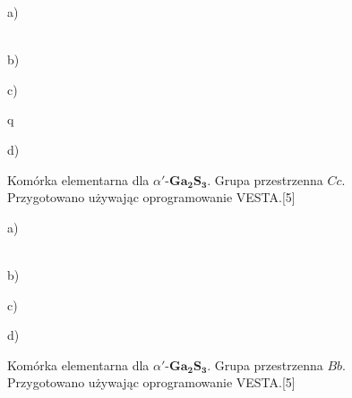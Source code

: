 \begin{enumerate}
	\begin{figure}[H]
		\begin{minipage}[h]{0.47\linewidth}
			 a) \\
		\end{minipage}
		\hfill
		\begin{minipage}[h]{0.47\linewidth}
			 \\b)
		\end{minipage}
		\vfill
		\begin{minipage}[h]{0.47\linewidth}
			 c) \\
		\end{minipage}q
		\hfill
		\begin{minipage}[h]{0.47\linewidth}
			 d) \\
		\end{minipage}
		\caption{Komórka elementarna dla $\alpha'$-$\mathbf{Ga_{2}S_{3}}$. Grupa przestrzenna $Cc$. Przygotowano używając oprogramowanie VESTA.[5]}
		\begin{minipage}[h]{0.47\linewidth}
			 a) \\
		\end{minipage}
		\hfill
		\begin{minipage}[h]{0.47\linewidth}
			 \\b)
		\end{minipage}
		\vfill
		\begin{minipage}[h]{0.47\linewidth}
			 c) \\
		\end{minipage}
		\hfill
		\begin{minipage}[h]{0.47\linewidth}
			 d) \\
		\end{minipage}
		\caption{Komórka elementarna dla $\alpha'$-$\mathbf{Ga_{2}S_{3}}$. Grupa przestrzenna $Bb$. Przygotowano używając oprogramowanie VESTA.[5]}
	\end{figure}
	

\end{enumerate}
